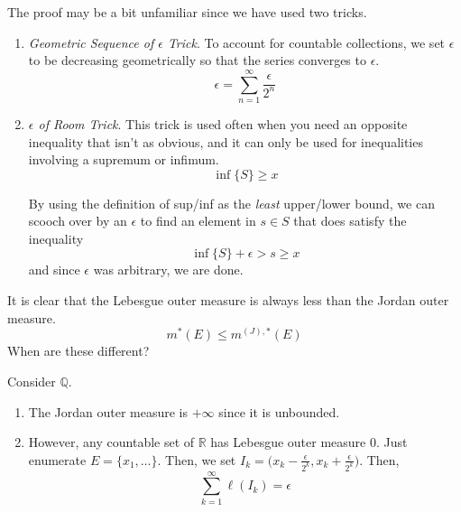   The proof may be a bit unfamiliar since we have used two tricks. 
  \begin{enumerate}
    \item \textit{Geometric Sequence of $\epsilon$ Trick}. To account for countable collections, we set $\epsilon$ to be decreasing geometrically so that the series converges to $\epsilon$. 
    \begin{equation}
      \epsilon = \sum_{n=1}^\infty \frac{\epsilon}{2^n}
    \end{equation}

    \item \textit{$\epsilon$ of Room Trick}. This trick is used often when you need an opposite inequality that isn't as obvious, and it can only be used for inequalities involving a supremum or infimum. 
    \begin{equation}
      \inf\{S\} \geq x
    \end{equation}

    By using the definition of sup/inf as the \textit{least} upper/lower bound, we can scooch over by an $\epsilon$ to find an element in $s \in S$ that does satisfy the inequality 
    \begin{equation}
      \inf\{S\} + \epsilon > s \geq x
    \end{equation}
    and since $\epsilon$ was arbitrary, we are done. 
  \end{enumerate}

  It is clear that the Lebesgue outer measure is always less than the Jordan outer measure. 
  \begin{equation}
    m^\ast (E) \leq m^{(J), \ast} (E) 
  \end{equation}
  When are these different? 

  \begin{example}
    Consider $\mathbb{Q}$. 
    \begin{enumerate}
      \item The Jordan outer measure is $+\infty$ since it is unbounded. 
      \item However, any countable set of $\mathbb{R}$ has Lebesgue outer measure $0$. Just enumerate $E = \{x_1, \ldots \}$. Then, we set $I_k = \big( x_k - \frac{\epsilon}{2^k}, x_k + \frac{\epsilon}{2^k} \big)$. Then, 
      \begin{equation}
        \sum_{k=1}^\infty \ell(I_k) = \epsilon
      \end{equation}
    \end{enumerate}
  \end{example}

